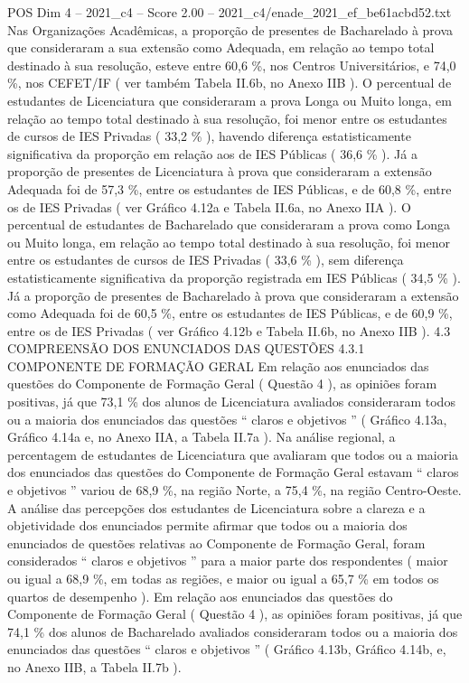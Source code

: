 \begin{textsample}{POS Dim 4 – 2021\_c4 – Score 2.00 – 2021\_c4/enade\_2021\_ef\_be61acbd52.txt}
Nas Organizações Acadêmicas, a proporção de presentes de Bacharelado à prova que consideraram a sua extensão como Adequada, em relação ao tempo total destinado à sua resolução, esteve entre 60,6 \%, nos Centros Universitários, e 74,0 \%, nos CEFET/IF ( ver também Tabela II.6b, no Anexo IIB ).
O percentual de estudantes de Licenciatura que consideraram a prova Longa ou Muito longa, em relação ao tempo total destinado à sua resolução, foi menor entre os estudantes de cursos de IES Privadas ( 33,2 \% ), havendo diferença estatisticamente significativa da proporção em relação aos de IES Públicas ( 36,6 \% ).
Já a proporção de presentes de Licenciatura à prova que consideraram a extensão Adequada foi de 57,3 \%, entre os estudantes de IES Públicas, e de 60,8 \%, entre os de IES Privadas ( ver Gráfico 4.12a e Tabela II.6a, no Anexo IIA ).
O percentual de estudantes de Bacharelado que consideraram a prova como Longa ou Muito longa, em relação ao tempo total destinado à sua resolução, foi menor entre os estudantes de cursos de IES Privadas ( 33,6 \% ), sem diferença estatisticamente significativa da proporção registrada em IES Públicas ( 34,5 \% ).
Já a proporção de presentes de Bacharelado à prova que consideraram a extensão como Adequada foi de 60,5 \%, entre os estudantes de IES Públicas, e de 60,9 \%, entre os de IES Privadas ( ver Gráfico 4.12b e Tabela II.6b, no Anexo IIB ). 4.3 COMPREENSÃO DOS ENUNCIADOS DAS QUESTÕES 4.3.1 COMPONENTE DE FORMAÇÃO GERAL Em relação aos enunciados das questões do Componente de Formação Geral ( Questão 4 ), as opiniões foram positivas, já que 73,1 \% dos alunos de Licenciatura avaliados consideraram todos ou a maioria dos enunciados das questões “ claros e objetivos ” ( Gráfico 4.13a, Gráfico 4.14a e, no Anexo IIA, a Tabela II.7a ).
Na análise regional, a percentagem de estudantes de Licenciatura que avaliaram que todos ou a maioria dos enunciados das questões do Componente de Formação Geral estavam “ claros e objetivos ” variou de 68,9 \%, na região Norte, a 75,4 \%, na região Centro-Oeste.
A análise das percepções dos estudantes de Licenciatura sobre a clareza e a objetividade dos enunciados permite afirmar que todos ou a maioria dos enunciados de questões relativas ao Componente de Formação Geral, foram considerados “ claros e objetivos ” para a maior parte dos respondentes ( maior ou igual a 68,9 \%, em todas as regiões, e maior ou igual a 65,7 \% em todos os quartos de desempenho ).
Em relação aos enunciados das questões do Componente de Formação Geral ( Questão 4 ), as opiniões foram positivas, já que 74,1 \% dos alunos de Bacharelado avaliados consideraram todos ou a maioria dos enunciados das questões “ claros e objetivos ” ( Gráfico 4.13b, Gráfico 4.14b, e, no Anexo IIB, a Tabela II.7b ).

\end{textsample}

